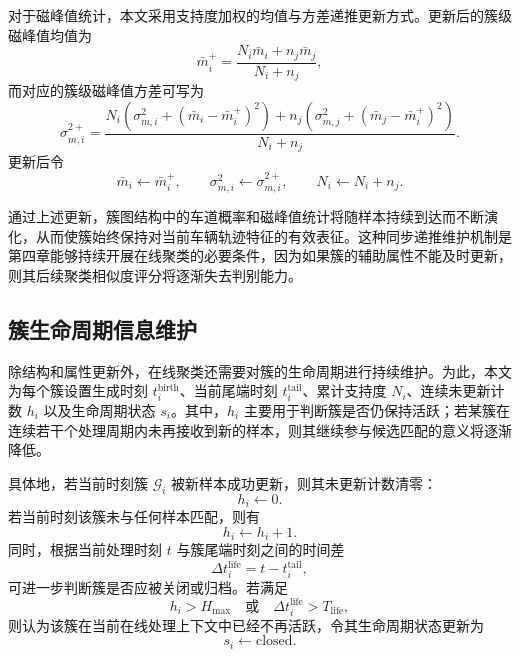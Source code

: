 \documentclass{xdupgthesis}
\begin{document}
对于磁峰值统计，本文采用支持度加权的均值与方差递推更新方式。更新后的簇级磁峰值均值为
\begin{equation}
	\bar m_i^{+}
	=
	\frac{N_i\bar m_i+n_j\bar m_j}{N_i+n_j},
\end{equation}
而对应的簇级磁峰值方差可写为
\begin{equation}
	\sigma_{m,i}^{2+}
	=
	\frac{
		N_i\left(\sigma_{m,i}^{2}+(\bar m_i-\bar m_i^{+})^2\right)
		+
		n_j\left(\sigma_{m,j}^{2}+(\bar m_j-\bar m_i^{+})^2\right)
	}{
		N_i+n_j
	}.
\end{equation}
更新后令
\begin{equation}
	\bar m_i \leftarrow \bar m_i^{+}, \qquad
	\sigma_{m,i}^{2} \leftarrow \sigma_{m,i}^{2+}, \qquad
	N_i \leftarrow N_i+n_j.
\end{equation}

通过上述更新，簇图结构中的车道概率和磁峰值统计将随样本持续到达而不断演化，从而使簇始终保持对当前车辆轨迹特征的有效表征。这种同步递推维护机制是第四章能够持续开展在线聚类的必要条件，因为如果簇的辅助属性不能及时更新，则其后续聚类相似度评分将逐渐失去判别能力。

\subsection{簇生命周期信息维护}

除结构和属性更新外，在线聚类还需要对簇的生命周期进行持续维护。为此，本文为每个簇设置生成时刻 $t_i^{\mathrm{birth}}$、当前尾端时刻 $t_i^{\mathrm{tail}}$、累计支持度 $N_i$、连续未更新计数 $h_i$ 以及生命周期状态 $s_i$。其中，$h_i$ 主要用于判断簇是否仍保持活跃；若某簇在连续若干个处理周期内未再接收到新的样本，则其继续参与候选匹配的意义将逐渐降低。

具体地，若当前时刻簇 $\mathcal{G}_i$ 被新样本成功更新，则其未更新计数清零：
\begin{equation}
	h_i \leftarrow 0.
\end{equation}
若当前时刻该簇未与任何样本匹配，则有
\begin{equation}
	h_i \leftarrow h_i + 1.
\end{equation}
同时，根据当前处理时刻 $t$ 与簇尾端时刻之间的时间差
\begin{equation}
	\Delta t_i^{\mathrm{life}} = t - t_i^{\mathrm{tail}},
\end{equation}
可进一步判断簇是否应被关闭或归档。若满足
\begin{equation}
	h_i > H_{\max}
	\quad \text{或} \quad
	\Delta t_i^{\mathrm{life}} > T_{\mathrm{life}},
\end{equation}
则认为该簇在当前在线处理上下文中已经不再活跃，令其生命周期状态更新为
\begin{equation}
	s_i \leftarrow \mathrm{closed}.
\end{equation}
\end{document}
